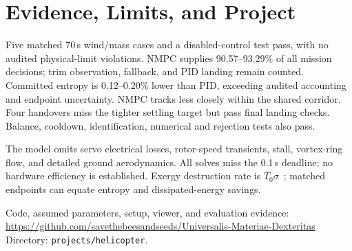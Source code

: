 \section{Evidence, Limits, and Project}
Five matched 70\,s wind/mass cases and a disabled-control test pass, with no
audited physical-limit violations. NMPC supplies 90.57--93.29\% of all mission
decisions; trim observation, fallback, and PID landing remain counted.
Committed entropy is 0.12--0.20\% lower than PID, exceeding audited accounting
and endpoint uncertainty. NMPC tracks less closely within the shared corridor.
Four handovers miss the tighter settling target but pass final landing checks.
Balance, cooldown, identification, numerical and rejection tests also pass.

The model omits servo electrical losses, rotor-speed transients, stall,
vortex-ring flow, and detailed ground aerodynamics. All solves miss the
0.1\,s deadline; no hardware efficiency is established. Exergy destruction rate is $T_0\sigma$~\cite{philipp2024};
matched endpoints can equate entropy and dissipated-energy savings.

\begingroup\raggedright
Code, assumed parameters, setup, viewer, and evaluation evidence:\\
\url{https://github.com/savethebeesandseeds/Universalis-Materiae-Dexteritas}\\
Directory: \texttt{projects/helicopter}.\par
\endgroup
\begingroup\raggedright


\endgroup

